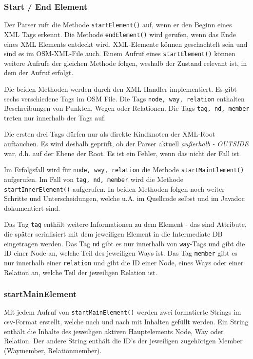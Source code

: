 \subsubsection{Start / End Element}
Der Parser ruft die Methode {\tt startElement()} auf, wenn er den Beginn eines XML
Tags erkennt. Die Methode {\tt endElement()} wird gerufen, wenn das Ende eines
XML Elements entdeckt wird. XML-Elemente können geschachtelt sein und sind es im
OSM-XML-File auch. Einem Aufruf eines {\tt startElement()} können weitere Aufrufe
der gleichen Methode folgen, weshalb der Zustand relevant ist, in dem der Aufruf erfolgt.

Die beiden Methoden werden durch den XML-Handler implementiert. Es gibt sechs verschiedene
Tags im OSM File. Die Tags {\tt node, way, relation} enthalten Beschreibungen von Punkten,
Wegen oder Relationen. Die Tags {\tt tag, nd, member} treten nur innerhalb der Tags
auf.

Die ersten drei Tags dürfen nur als direkte Kindknoten der XML-Root
auftauchen. Es wird deshalb geprüft, ob der Parser aktuell {\it außerhalb - OUTSIDE}
war, d.h. auf der Ebene der Root. Es ist ein Fehler, wenn das nicht der Fall ist.

Im Erfolgsfall wird für {\tt node, way, relation} die Methode {\tt startMainElement()} aufgerufen. Im Fall von {\tt tag, nd, 
member} wird die Methode {\tt startInnerElement()} aufgerufen. In beiden Methoden folgen noch weiter Schritte und Unterscheidungen, welche u.A. im Quellcode selbst und im Javadoc dokumentiert sind.

Das Tag {\tt tag} enthält weitere Informationen zu dem Element - das sind Attribute, 
die später serialisiert mit dem jeweiligen Element in die Intermediate DB eingetragen werden. 
Das Tag {\tt nd} gibt es nur innerhalb von {\tt way}-Tags und gibt die ID einer Node an, welche Teil des jeweiligen Ways ist. 
Das Tag {\tt member} gibt es nur innerhalb einer {\tt relation} und gibt die ID einer Node, eines Ways oder einer Relation an, welche Teil der jeweiligen Relation ist.

\subsubsection{startMainElement}
Mit jedem Aufruf von {\tt startMainElement()} werden zwei formatierte Strings im csv-Format erstellt, welche nach und nach mit Inhalten gefüllt werden. Ein String enthält die Inhalte des jeweiligen aktiven Hauptelements Node, Way oder Relation. Der andere String enthält die ID's der jeweiligen zugehörigen Member (Waymember, Relationmember).

